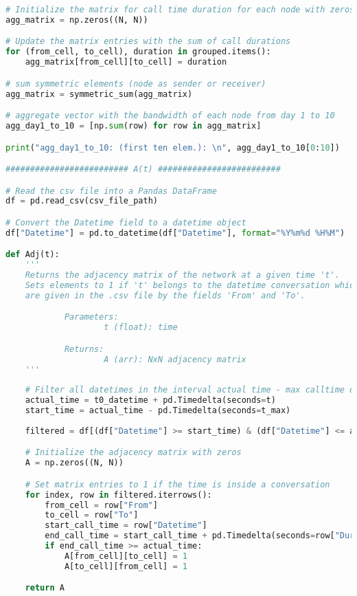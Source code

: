 \begin{lstlisting}[language=Python, caption=Voice call experiment]
# Initialize the matrix for call time duration for each node with zeros
agg_matrix = np.zeros((N, N))

# Update the matrix entries with the sum of call durations
for (from_cell, to_cell), duration in grouped.items():
    agg_matrix[from_cell][to_cell] = duration

# sum symmetric elements (node as sender or receiver)  
agg_matrix = symmetric_sum(agg_matrix)

# aggregate vector with the bandwidth of each node from day 1 to 10
agg_day1_to_10 = [np.sum(row) for row in agg_matrix]

print("agg_day1_to_10: (first ten elem.): \n", agg_day1_to_10[0:10])

######################### A(t) #########################

# Read the csv file into a Pandas DataFrame
df = pd.read_csv(csv_file_path)

# Convert the Datetime field to a datetime object
df["Datetime"] = pd.to_datetime(df["Datetime"], format="%Y%m%d %H%M")

def Adj(t):
    '''
    Returns the adjacency matrix of the network at a given time 't'. 
    Sets elements to 1 if 't' belongs to the datetime conversation which nodes
    are given in the .csv file by the fields 'From' and 'To'.

            Parameters:
                    t (float): time

            Returns:
                    A (arr): NxN adjacency matrix
    '''
    
    # Filter all datetimes in the interval actual time - max calltime duration
    actual_time = t0_datetime + pd.Timedelta(seconds=t)
    start_time = actual_time - pd.Timedelta(seconds=t_max)
    
    filtered = df[(df["Datetime"] >= start_time) & (df["Datetime"] <= actual_time)]

    # Initialize the adjacency matrix with zeros
    A = np.zeros((N, N))

    # Set matrix entries to 1 if the time is inside a conversation
    for index, row in filtered.iterrows():
        from_cell = row["From"]
        to_cell = row["To"]
        start_call_time = row["Datetime"]
        end_call_time = start_call_time + pd.Timedelta(seconds=row["Duration(seconds)"])
        if end_call_time >= actual_time:
            A[from_cell][to_cell] = 1
            A[to_cell][from_cell] = 1

    return A


\end{lstlisting}
